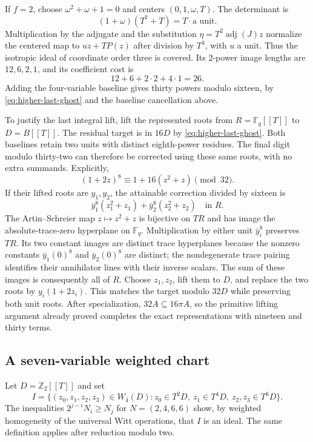 \documentclass[11pt]{amsart}
\theoremstyle{definition}
\numberwithin{equation}{section}
\begin{document}
If $f=2$, choose $\omega^2+\omega+1=0$ and centers $(0,1,\omega,T)$.
The determinant is
\[
 (1+\omega)(T^7+T)=T\cdot\text{a unit}.
\]
Multiplication by the adjugate and the substitution
$\eta=T^2\operatorname{adj}(J)z$ normalize the centered map to
$uz+TP(z)$ after division by $T^3$, with $u$ a unit. Thus the
isotropic ideal of coordinate order three is covered. Its $2$-power
image lengths are $12,6,2,1$, and its coefficient cost is
\[
 12+6+2\cdot2+4\cdot1=26.
\]
Adding the four-variable baseline gives thirty powers modulo sixteen,
by \eqref{eq:higher-last-ghost} and the baseline cancellation above.

To justify the last integral lift, lift the represented roots from
$R=\mathbb F_q[[T]]$ to $D=B[[T]]$. The residual target is in $16D$
by \eqref{eq:higher-last-ghost}. Both baselines retain two units
with distinct eighth-power residues. The final digit modulo
thirty-two can therefore be corrected using these same roots, with
no extra summands. Explicitly,
\[
 (1+2z)^8\equiv1+16(z^2+z)\pmod{32}.
\]
If their lifted roots are $y_1,y_2$, the attainable correction divided
by sixteen is
\[
 \bar y_1^8(z_1^2+z_1)+\bar y_2^8(z_2^2+z_2)\quad\text{in }R.
\]
The Artin--Schreier map $z\mapsto z^2+z$ is bijective on $TR$ and
has image the absolute-trace-zero hyperplane on $\mathbb F_q$.
Multiplication by either unit $\bar y_i^8$ preserves $TR$.
Its two constant images are distinct trace hyperplanes because the
nonzero constants $\bar y_1(0)^8$ and $\bar y_2(0)^8$ are distinct;
the nondegenerate trace pairing identifies their annihilator lines
with their inverse scalars. The sum of these images is consequently
all of $R$. Choose $z_1,z_2$, lift them to $D$, and replace the two
roots by $y_i(1+2z_i)$. This matches the target modulo $32D$ while
preserving both unit roots. After specialization, $32A\subseteq16\pi A$,
so the primitive lifting argument already proved completes the exact
representations with nineteen and thirty terms.

\subsection{A seven-variable weighted chart}

Let $D=\mathbb Z_2[[T]]$ and set
\[
 I=\{(z_0,z_1,z_2,z_3)\in W_4(D):
 z_0\in T^2D,\ z_1\in T^4D,\ z_2,z_3\in T^6D\}.
\]
The inequalities $2^{j-i}N_i\ge N_j$ for
$N=(2,4,6,6)$ show, by weighted homogeneity of the universal Witt
operations, that $I$ is an ideal. The same definition applies after
reduction modulo two.
\end{document}
